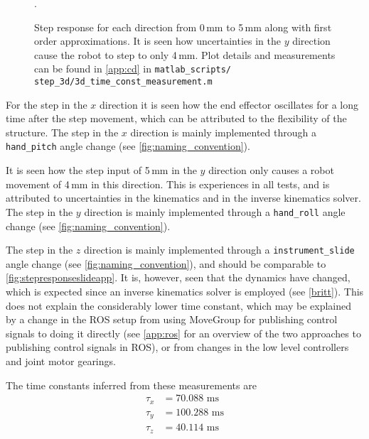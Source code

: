 \begin{figure}[h]
	\centering
	\hspace{1mm}
	\hspace{1mm}
	\caption{Step response for each direction  from 0\,mm to 5\,mm along with first order approximations. It is seen how uncertainties in the $y$ direction cause the robot to step to only 4\,mm. Plot details and measurements can be found in \autoref{app:cd} in \texttt{matlab\_scripts/ step\_3d/3d\_time\_const\_measurement.m}}. 
	\label{fig:stepresponses_xyz}
\end{figure}

For the step in the $x$ direction it is seen how the end effector oscillates for a long time after the step movement, which can be attributed to the flexibility of the structure. The step in the $x$ direction is mainly implemented through a \texttt{hand\_pitch} angle change (see \autoref{fig:naming_convention}).

It is seen how the step input of 5\,mm in the $y$ direction only causes a robot movement of 4\,mm in this direction. This is experiences in all tests, and is attributed to uncertainties in the kinematics and in the inverse kinematics solver. The step in the $y$ direction is mainly implemented through a \texttt{hand\_roll} angle change (see \autoref{fig:naming_convention}).

The step in the $z$ direction is mainly implemented through a \texttt{instrument\_slide} angle change (see \autoref{fig:naming_convention}), and should be comparable to \autoref{fig:stepresponseslideapp}. It is, however, seen that the dynamics have changed, which is expected since an inverse kinematics solver is employed (see \autoref{britt}). This does not explain the considerably lower time constant, which may be explained by a change in the ROS setup from using MoveGroup for publishing control signals to doing it directly (see \autoref{app:ros} for an overview of the two approaches to publishing control signals in ROS), or from changes in the low level controllers and joint motor gearings.




The time constants inferred from these measurements are
\begin{align*}
\tau_x &= 70.088 \text{ ms}\\
\tau_y &= 100.288 \text{ ms}\\
\tau_z &= 40.114 \text{ ms}
\end{align*}

